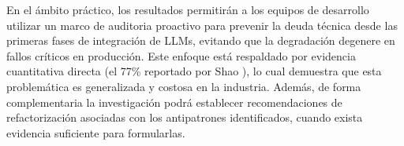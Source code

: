 En el ámbito práctico, los resultados permitirán a los equipos de desarrollo utilizar un marco de auditoria proactivo para prevenir la deuda técnica desde las primeras fases de integración de LLMs, evitando que la degradación degenere en fallos críticos en producción. Este enfoque está respaldado por evidencia cuantitativa directa (el 77\% reportado por Shao \cite{shao_are_2024}), lo cual demuestra que esta problemática es generalizada y costosa en la industria. Además, de forma complementaria la investigación podrá establecer recomendaciones de refactorización asociadas con los antipatrones identificados, cuando exista evidencia suficiente para formularlas.